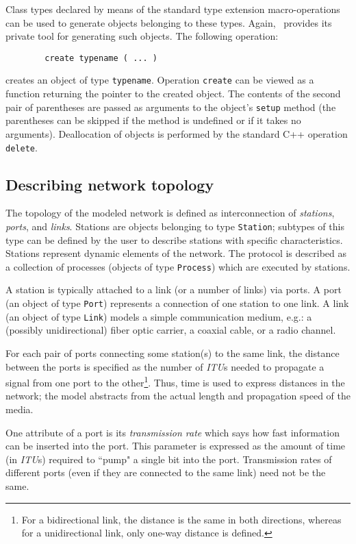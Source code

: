 Class types declared by means of the standard type extension macro-operations
can be used to generate objects belonging to these types.
Again, \smurph\ provides its private tool for generating such objects.
The following operation:
{\small
\begin{verbatim}
        create typename ( ... )
\end{verbatim} }
\noindent
creates an object of type {\tt typename}.
Operation {\tt create} can be viewed as
a function returning the pointer to the created object.
The contents of the second pair of parentheses are passed as arguments to
the object's {\tt setup} method (the parentheses can be skipped if the method
is undefined or if it takes no arguments).
Deallocation of objects is performed by the standard C++ operation {\tt delete}.

\subsection{Describing network topology}

The topology of the modeled network is defined as interconnection of
{\em stations}, {\em ports}, and {\em links}.
Stations are objects belonging to type {\tt Station}; subtypes of this type
can be defined by the user to describe stations with specific characteristics.
Stations represent dynamic elements of the network.
The protocol is described as a collection of processes (objects of type
{\tt Process}) which are executed by stations.

A station is typically attached to a link (or a number of links) via ports.
A port (an object of type {\tt Port}) represents a connection of one
station to one link.
A link (an object of type {\tt Link}) models a simple
communication medium, e.g.:
a (possibly unidirectional) fiber optic carrier, a coaxial cable,
or a radio channel.

For each pair of ports connecting some station(s) to the same link, the
distance between the ports is specified as the number of {\em ITU\/}s
needed to propagate a signal from one port to the other\footnote{For a
bidirectional link, the distance is the same in both directions, whereas for
a unidirectional link, only one-way distance is defined.}.
Thus, time is used to express distances in the network; the model
abstracts from the actual length and propagation speed of the media.

One attribute of a port is its {\em transmission rate\/} which says how
fast information can be inserted into the port.
This parameter is expressed as the amount of time (in {\em ITU\/}s)
required to ``pump" a single bit into the port.
Transmission rates of different ports
(even if they are connected to the same link) need not be the same.

